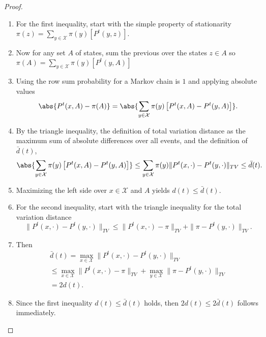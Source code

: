 \documentclass[12pt]{article}
\begin{document}
\begin{proof}
    \begin{enumerate}
        \item
            For the first inequality, start with the simple property of
            stationarity \( \pi(z) = \sum_{y \in \mathcal{X}} \pi(y)
            \left[ P^t(y,z) \right] \).
        \item
            Now for any set \( A \) of states, sum the previous over the
            states \( z \in A \) so \( \pi(A) = \sum_{y \in \mathcal{X}}
            \pi(y) \left[ P^t(y,A) \right] \)
        \item
            Using the row sum probability for a Markov chain is \( 1 \)
            and applying absolute values
            \[
                \abs{P^t(x,A) - \pi(A)} = \abs{\sum_{y \in \mathcal{X}}
                \pi(y) \left[ P^t(x,A) - P^{t}(y,A)\right]}.
            \]
        \item
            By the triangle inequality, the definition of total
            variation distance as the maximum sum of absolute
            differences over all events, and the definition of \( \bar{d}
            (t) \),
            \[
                \abs{\sum_{y \in \mathcal{X}} \pi(y) \left[ P^t(x,A) - P^
                {t}(y,A)\right]} \le \sum_{y \in \mathcal{X}} \pi(y) \|
                P^t(x,\cdot) - P^t(y,\cdot)\|_{TV} \le \bar{d}(t).
            \]
        \item
            Maximizing the left side over \( x \in \mathcal{X} \) and \(
            A \) yields \( d(t) \le \bar{d}(t) \).
        \item
            For the second inequality, start with the triangle
            inequality for the total variation distance
            \[
                \| P^t(x, \cdot) - P^t(y,\cdot)\|_{TV} \le \| P^t(x,
                \cdot) - \pi\|_{TV} + \| \pi - P^t(y,\cdot)\|_{TV}.
            \]
        \item
            Then
            \begin{multline*}
                \bar{d}(t) = \max_{x \in \mathcal{X}} \| P^t(x, \cdot)
                - P^t(y,\cdot)\|_{TV} \\
                \le \max_{x \in \mathcal{X}}\| P^t(x, \cdot) - \pi\|_{TV}
                + \max_{y \in \mathcal{X}} \| \pi - P^t(y,\cdot)\|_{TV}
                \\
                = 2 d(t).
            \end{multline*}
        \item
            Since the first inequality \( d(t) \le \bar{d}(t) \) holds,
            then \( 2d(t) \le 2\bar{d}(t) \) follows immediately.
    \end{enumerate}
\end{proof}
\end{document}
